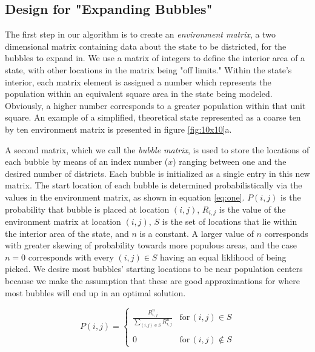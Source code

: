 \documentclass[11pt]{article}				%
\begin{document}
	\subsection{Design for "Expanding Bubbles"}\label{sec:bubbles}

The first step in our algorithm is to create an \textit{environment
matrix}, a two dimensional matrix containing data about the state to be
districted, for the bubbles to expand in. We use a matrix of integers to
define the interior area of a state, with other locations in the matrix
being "off limits." Within the state's interior, each matrix element is
assigned a number which represents the population within an equivalent
square area in the state being modeled. Obviously, a higher number
corresponds to a greater population within that unit square. An example
of a simplified, theoretical state represented as a coarse ten by ten
environment matrix is presented in figure \ref{fig:10x10}a. 

A second matrix, which we call the \textit{bubble matrix}, is used to
store the locations of each bubble by means of an index number ($x$)
ranging between one and the desired number of districts. Each bubble is
initialized as a single entry in this new matrix. The start location of
each bubble is determined probabilistically via the values in the
environment matrix, as shown in equation \ref{eq:one}. $P(i,j)$ is the
probability that bubble is placed at location $(i,j)$, $R_{i,j}$ is the
value of the environment matrix at location $(i,j)$, $S$ is the set of
locations that lie within the interior area of the state, and $n$ is a
constant. A larger value of $n$ corresponds with greater skewing of
probability towards more populous areas, and the case $n=0$ corresponds
with every $(i,j) \in S$ having an equal liklihood of being picked. We
desire most bubbles' starting locations to be near population centers
because we make the assumption that these are good approximations for
where most bubbles will end up in an optimal solution.

\begin{equation}\label{eq:one}
P(i,j) = \left\lbrace \begin{array}{cc}
\frac{\displaystyle R_{i,j}^n}{\displaystyle \sum_{(i,j) \in S}
R_{i,j}^n} & \mathrm{for}\, (i,j) \in S \\ \\
0 & \mathrm{for}\, (i,j) \notin S
\end{array}\right.
\end{equation}
\end{document}
